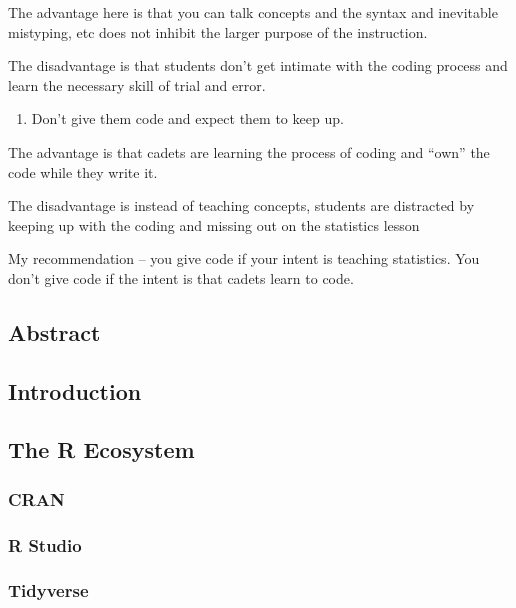 \documentclass[]{article}
\providecommand{\tightlist}{%
  \setlength{\itemsep}{0pt}\setlength{\parskip}{0pt}}
\begin{document}
The advantage here is that you can talk concepts and the syntax and
inevitable mistyping, etc does not inhibit the larger purpose of the
instruction.

The disadvantage is that students don't get intimate with the coding
process and learn the necessary skill of trial and error.

\begin{enumerate}
\def\labelenumi{\arabic{enumi})}
\setcounter{enumi}{1}
\tightlist
\item
  Don't give them code and expect them to keep up.
\end{enumerate}

The advantage is that cadets are learning the process of coding and
``own'' the code while they write it.

The disadvantage is instead of teaching concepts, students are
distracted by keeping up with the coding and missing out on the
statistics lesson

My recommendation -- you give code if your intent is teaching
statistics. You don't give code if the intent is that cadets learn to
code.

\subsection{Abstract}\label{abstract}

\subsection{Introduction}\label{introduction}

\subsection{The R Ecosystem}\label{the-r-ecosystem}

\subsubsection{CRAN}\label{cran}

\subsubsection{R Studio}\label{r-studio}

\subsubsection{Tidyverse}\label{tidyverse}
\end{document}

